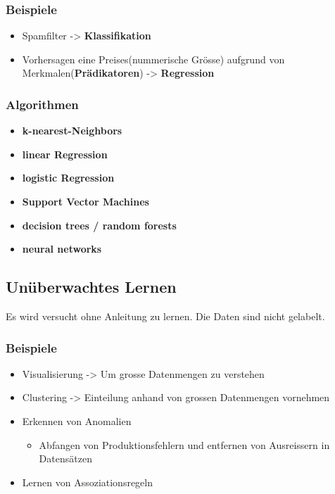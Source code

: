\documentclass[11pt]{article}
\providecommand{\tightlist}{%
      \setlength{\itemsep}{0pt}\setlength{\parskip}{0pt}}
\begin{document}
\subsubsection{Beispiele}\label{beispiele}

\begin{itemize}
\tightlist
\item
  Spamfilter -\textgreater{} \textbf{Klassifikation}
\item
  Vorhersagen eine Preises(nummerische Grösse) aufgrund von
  Merkmalen(\textbf{Prädikatoren}) -\textgreater{} \textbf{Regression}
\end{itemize}

\subsubsection{Algorithmen}\label{algorithmen}

\begin{itemize}
\tightlist
\item
  \textbf{k-nearest-Neighbors}
\item
  \textbf{linear Regression}
\item
  \textbf{logistic Regression}
\item
  \textbf{Support Vector Machines}
\item
  \textbf{decision trees / random forests}
\item
  \textbf{neural networks}
\end{itemize}

    \subsection{Unüberwachtes Lernen}\label{unuxfcberwachtes-lernen}

Es wird versucht ohne Anleitung zu lernen. Die Daten sind nicht
gelabelt.

\subsubsection{Beispiele}\label{beispiele}

\begin{itemize}
\tightlist
\item
  Visualisierung -\textgreater{} Um grosse Datenmengen zu verstehen
\item
  Clustering -\textgreater{} Einteilung anhand von grossen Datenmengen
  vornehmen
\item
  Erkennen von Anomalien

  \begin{itemize}
  \tightlist
  \item
    Abfangen von Produktionsfehlern und entfernen von Ausreissern in
    Datensätzen
  \end{itemize}
\item
  Lernen von Assoziationsregeln
\end{itemize}
\end{document}
